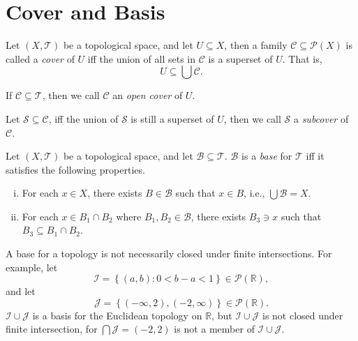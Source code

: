\section{Cover and Basis}


\begin{definition}
	[cover]
	\label{def: cover}
	Let $(X, \mathcal T)$ be a topological space, and let $U \subseteq X$, then a family $\mathcal C \subseteq \mathcal P(X)$ is called a \textit{cover} of $U$ iff the union of all sets in $\mathcal C$ is a superset of $U$. That is,
	$$
	U \subseteq \bigcup \mathcal C.
	$$
	
	If $\mathcal C \subseteq \mathcal T$, then we call $\mathcal C$ an \textit{open cover} of $U$.
	
	Let $\mathcal S \subseteq \mathcal C$, iff the union of $\mathcal S$ is still a superset of $U$, then we call $\mathcal S$ a \textit{subcover} of $\mathcal C$.
\end{definition}


\begin{definition}
	[basis]
	\label{def: basis}
	\label{theorem: alt def of basis}
	Let $(X, \mathcal T)$ be a topological space, and let $\mathcal B\subseteq \mathcal T$. $\mathcal B$ is a \textit{base} for $\mathcal T$ iff it satisfies the following properties.
	\begin{enumerate}[(i)]
		\item For each $x \in X$, there exists $B \in \mathcal B$ such that $x \in B$, i.e., $\bigcup \mathcal B = X$.
		\item For each $x \in B_1 \cap B_2$ where $B_1, B_2 \in \mathcal B$, there exists $B_3 \ni x$ such that $B_3 \subseteq B_1 \cap B_2$.
	\end{enumerate}
\end{definition}


\begin{note}
	A base for a topology is not necessarily closed under finite intersections. For example, let
	$$
	\mathcal I = \left\{ (a,b) : 0 < b - a < 1 \right\} \in \mathcal P(\mathbb R),
	$$
	and let
	$$
	\mathcal J = \left\{ (-\infty, 2), (-2, \infty) \right\} \in \mathcal P(\mathbb R).
	$$
	$\mathcal I \cup \mathcal J$ is a basis for the Euclidean topology on $\mathbb R$, but $\mathcal I \cup \mathcal J$ is not closed under finite intersection, for $\bigcap \mathcal J = (-2, 2)$ is not a member of $\mathcal I \cup \mathcal J$.
\end{note}


